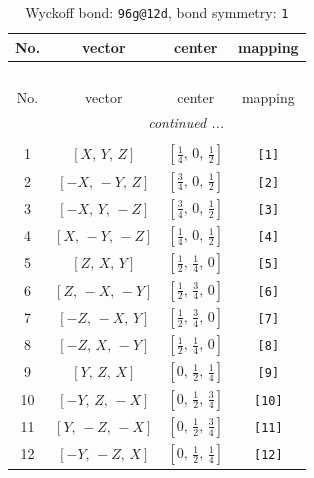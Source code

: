 \documentclass[fleqn,8pt]{jsarticle}
\begin{document}
\begin{longtable}{cccc}
\caption{Wyckoff bond: {\tt 96g@12d}, bond symmetry: {\tt 1}}
 \\
 \hline \hline
No. & vector & center & mapping \\ \hline \endfirsthead

\multicolumn{3}{l}{\tablename\ \thetable{}} \\
 \hline \hline
No. & vector & center & mapping \\ \hline \endhead

 \hline \hline
\multicolumn{3}{r}{\footnotesize\it continued ...} \\ \endfoot

 \hline \hline
\multicolumn{3}{r}{} \\ \endlastfoot

1 & $\left[ X,\, Y,\, Z \right]$ & $\left[ \frac{1}{4},\, 0,\, \frac{1}{2} \right]$ & {\tt [1]} \\ \hline
2 & $\left[ - X,\, - Y,\, Z \right]$ & $\left[ \frac{3}{4},\, 0,\, \frac{1}{2} \right]$ & {\tt [2]} \\ \hline
3 & $\left[ - X,\, Y,\, - Z \right]$ & $\left[ \frac{3}{4},\, 0,\, \frac{1}{2} \right]$ & {\tt [3]} \\ \hline
4 & $\left[ X,\, - Y,\, - Z \right]$ & $\left[ \frac{1}{4},\, 0,\, \frac{1}{2} \right]$ & {\tt [4]} \\ \hline
5 & $\left[ Z,\, X,\, Y \right]$ & $\left[ \frac{1}{2},\, \frac{1}{4},\, 0 \right]$ & {\tt [5]} \\ \hline
6 & $\left[ Z,\, - X,\, - Y \right]$ & $\left[ \frac{1}{2},\, \frac{3}{4},\, 0 \right]$ & {\tt [6]} \\ \hline
7 & $\left[ - Z,\, - X,\, Y \right]$ & $\left[ \frac{1}{2},\, \frac{3}{4},\, 0 \right]$ & {\tt [7]} \\ \hline
8 & $\left[ - Z,\, X,\, - Y \right]$ & $\left[ \frac{1}{2},\, \frac{1}{4},\, 0 \right]$ & {\tt [8]} \\ \hline
9 & $\left[ Y,\, Z,\, X \right]$ & $\left[ 0,\, \frac{1}{2},\, \frac{1}{4} \right]$ & {\tt [9]} \\ \hline
10 & $\left[ - Y,\, Z,\, - X \right]$ & $\left[ 0,\, \frac{1}{2},\, \frac{3}{4} \right]$ & {\tt [10]} \\ \hline
11 & $\left[ Y,\, - Z,\, - X \right]$ & $\left[ 0,\, \frac{1}{2},\, \frac{3}{4} \right]$ & {\tt [11]} \\ \hline
12 & $\left[ - Y,\, - Z,\, X \right]$ & $\left[ 0,\, \frac{1}{2},\, \frac{1}{4} \right]$ & {\tt [12]} \\ \hline

\end{longtable}
\end{document}
